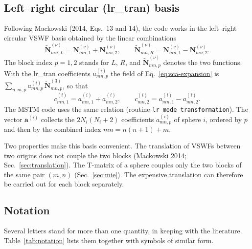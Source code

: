 \documentclass[11pt,a4paper]{article}
\begin{document}
\subsection{Left--right circular (lr\_tran) basis}
\label{sec:lr-basis}

Following Mackowski (2014, Eqs.~13 and 14), the code works in the left--right circular VSWF basis obtained by the linear combinations
\begin{equation}
  \tilde{\bm{N}}_{mn,L}^{(\nu)} = \bm{N}_{mn,1}^{(\nu)} + \bm{N}_{mn,2}^{(\nu)}, \qquad
  \tilde{\bm{N}}_{mn,R}^{(\nu)} = \bm{N}_{mn,1}^{(\nu)} - \bm{N}_{mn,2}^{(\nu)}.
  \label{eq:lr-basis}
\end{equation}
The block index $p = 1, 2$ stands for $L$, $R$, and $\tilde{\bm{N}}_{mn,p}^{(\nu)}$ denotes the two functions.
With the lr\_tran coefficients $a_{mn,p}^{(i)}$ the field of Eq.~\eqref{eq:sca-expansion} is $\sum_{n,m,p} a_{mn,p}^{(i)}\,\tilde{\bm{N}}_{mn,p}^{(3)}$, so that
\begin{equation}
  c_{mn,1}^{(i)} = a_{mn,1}^{(i)} + a_{mn,2}^{(i)}, \qquad
  c_{mn,2}^{(i)} = a_{mn,1}^{(i)} - a_{mn,2}^{(i)}.
  \label{eq:lr-coefficient-relation}
\end{equation}
The MSTM code uses the same relation (routine \texttt{lr\_mode\_transformation}).
The vector $\bm{a}^{(i)}$ collects the $2N_i(N_i+2)$ coefficients $a_{mn,p}^{(i)}$ of sphere $i$, ordered by $p$ and then by the combined index $mn = n(n+1) + m$.

Two properties make this basis convenient.
The translation of VSWFs between two origins does not couple the two blocks (Mackowski 2014; Sec.~\ref{sec:translation}).
The T-matrix of a sphere couples only the two blocks of the same pair $(m, n)$ (Sec.~\ref{sec:mie}).
The expensive translation can therefore be carried out for each block separately.

\subsection{Notation}
\label{sec:notation}

Several letters stand for more than one quantity, in keeping with the literature.
Table~\ref{tab:notation} lists them together with symbols of similar form.
\end{document}
